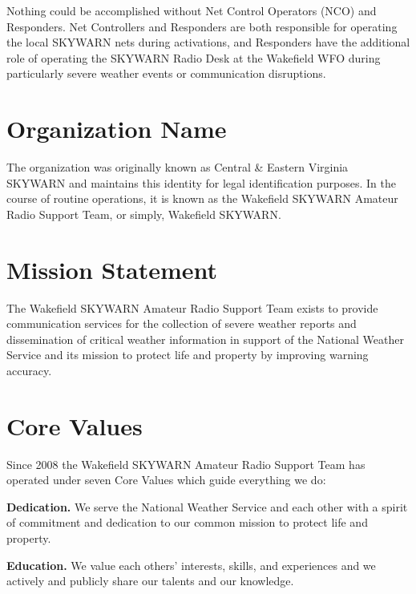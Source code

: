 \documentclass[pdflatex,letterpaper,twoside,12pt]{book}
\begin{document}
Nothing could be accomplished without Net Control Operators (NCO) and Responders.  Net Controllers and Responders are both responsible for operating the local SKYWARN nets during activations, and Responders have the additional role of operating the SKYWARN Radio Desk at the Wakefield WFO during particularly severe weather events or communication disruptions.


\section{Organization Name}

The organization was originally known as Central \& Eastern Virginia SKYWARN and maintains this identity for legal identification purposes.  In the course of routine operations, it is known as the Wakefield SKYWARN Amateur Radio Support Team, or simply, Wakefield SKYWARN.


\section{Mission Statement}

The Wakefield SKYWARN Amateur Radio Support Team exists to provide communication services for the collection of severe weather reports and dissemination of critical weather information in support of the National Weather Service and its mission to protect life and property by improving warning accuracy.


\section{Core Values}

Since 2008 the Wakefield SKYWARN Amateur Radio Support Team has operated under seven Core Values which guide everything we do:

\textbf{Dedication.} We serve the National Weather Service and each other with a spirit of commitment and dedication to our common mission to protect life and property.

\textbf{Education.} We value each others' interests, skills, and experiences and we actively and publicly share our talents and our knowledge.
\end{document}
